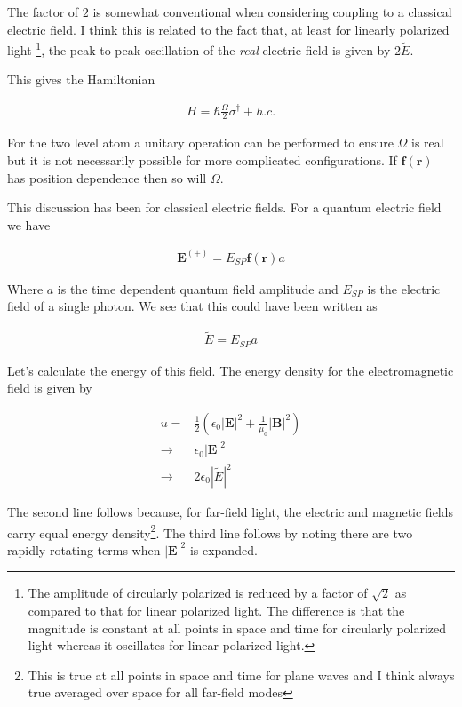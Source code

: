 \documentclass[12pt]{article}
\newcommand{\ep}{\epsilon}
\renewcommand{\vec}[1]{\boldsymbol{#1}}
\begin{document}
The factor of $2$ is somewhat conventional when considering coupling to a classical electric field.
I think this is related to the fact that, at least for linearly polarized light \footnote{The amplitude of circularly polarized is reduced by a factor of $\sqrt{2}$ as compared to that for linear polarized light. The difference is that the magnitude is constant at all points in space and time for circularly polarized light whereas it oscillates for linear polarized light.}, the peak to peak oscillation of the \textit{real} electric field is given by $2\tilde{E}$.

This gives the Hamiltonian

\begin{align}
H = \hbar \frac{\Omega}{2} \sigma^{\dag} + h.c.
\end{align}

For the two level atom a unitary operation can be performed to ensure $\Omega$ is real but it is not necessarily possible for more complicated configurations.
If $\vec{f}(\vec{r})$ has position dependence then so will $\Omega$.

This discussion has been for classical electric fields.
For a quantum electric field we have

\begin{align}
\vec{E}^{(+)} = E_{SP}\vec{f}(\vec{r})a
\end{align}

Where $a$ is the time dependent quantum field amplitude and $E_{SP}$ is the electric field of a single photon.
We see that this could have been written as

\begin{align}
\tilde{E} = E_{SP}a
\end{align}

Let's calculate the energy of this field.
The energy density for the electromagnetic field is given by

\begin{align}
u =& \frac{1}{2}\left(\ep_0 |\vec{E}|^2 + \frac{1}{\mu_0} |\vec{B}|^2\right)\\
\rightarrow& \ep_0 |\vec{E}|^2\\
\rightarrow& 2\ep_0 |\tilde{E}|^2
\end{align}

The second line follows because, for far-field light, the electric and magnetic fields carry equal energy density\footnote{This is true at all points in space and time for plane waves and I think always true averaged over space for all far-field modes}.
The third line follows by noting there are two rapidly rotating terms when $|\vec{E}|^2$ is expanded.
\end{document}
